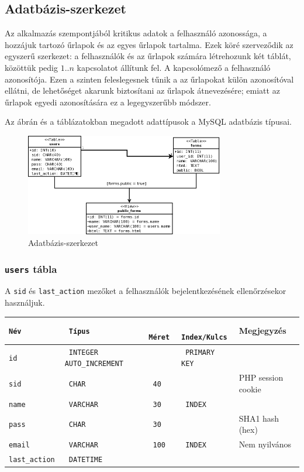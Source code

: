 \documentclass[12pt,a4paper,twoside]{article}
\begin{document}
\subsection{Adatbázis-szerkezet}

Az alkalmazás szempontjából kritikus adatok a felhasználó azonossága, a hozzájuk
tartozó űrlapok és az egyes űrlapok tartalma. Ezek köré szerveződik az egyszerű
szerkezet: a felhasználók és az űrlapok számára létrehozunk két táblát, közöttük
pedig $1..n$ kapcsolatot állítunk fel. A kapcsolómező a felhasználó
azonosítója. Ezen a szinten feleslegesnek tűnik a az űrlapokat külön
azonosítóval ellátni, de lehetőséget akarunk biztosítani az űrlapok
átnevezésére; emiatt az űrlapok egyedi azonosítására ez a legegyszerűbb módszer.

Az ábrán és a táblázatokban megadott adattípusok a MySQL adatbázis típusai.

\begin{figure}[htp]
  \centering
  \includegraphics[width=328px]{db.png}
  \caption{Adatbázis-szerkezet}\label{fig:db}
\end{figure}

\subsubsection{\texttt{users} tábla}
A \texttt{sid} és \texttt{last\_action} mezőket a felhasználók bejelentkezésének
ellenőrzésekor használjuk.

\small
\vspace{.3cm}
\begin{tabular*}{\textwidth}{>{\tt}l>{\tt}l>{\tt}l>{\tt}l|l}
  \rm Név       &  \rm Típus  &  \rm Méret  & \rm Index/Kulcs & Megjegyzés           \\
  \hline
  id           &   INTEGER AUTO\_INCREMENT && PRIMARY KEY    &                      \\
  sid          &   CHAR      & 40          &                 &  PHP session cookie  \\
  name         &   VARCHAR   & 30          & INDEX           &                      \\
  pass         &   CHAR      & 30          &                 &  SHA1 hash (hex)     \\
  email        &   VARCHAR   & 100         & INDEX           &  Nem nyilvános       \\
  last\_action &   DATETIME  &             &                 &
\end{tabular*}
\normalsize
\end{document}
